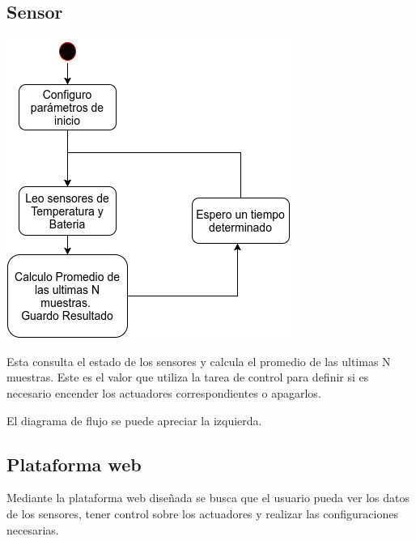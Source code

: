 \subsection*{Sensor}
\begin{minipage}{0.4\textwidth}
  \includegraphics[width=\linewidth,scale=.5]{./Figures/sensor_task.png}
\end{minipage}\hspace{5mm} %
\begin{minipage}{0.6\textwidth}
Esta consulta el estado de los sensores y calcula el promedio de las ultimas N muestras. Este es el valor que utiliza la tarea de control para definir si es necesario encender los actuadores correspondientes o apagarlos.

El diagrama de flujo se puede apreciar la izquierda.
\end{minipage}

\subsection{ Plataforma web}
Mediante la plataforma web diseñada se busca que el usuario pueda ver los datos de los sensores, tener control sobre los actuadores y realizar las configuraciones necesarias. 

